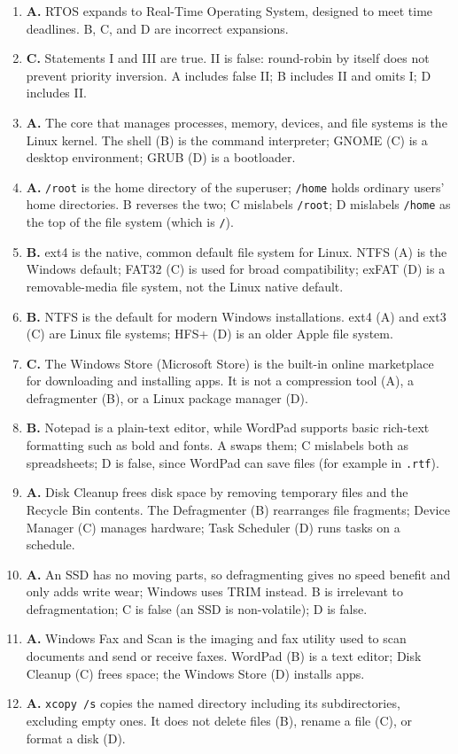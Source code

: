 \documentclass[11pt]{article}
\begin{document}
\begin{enumerate}[label=\textbf{Q\arabic*.}, leftmargin=*]
  process as soon as a higher-priority process becomes ready. A and C describe
  non-preemptive behaviour; D is not a preemption trigger.
\item \textbf{A.} RTOS expands to Real-Time Operating System, designed to meet
  time deadlines. B, C, and D are incorrect expansions.
\item \textbf{C.} Statements I and III are true. II is false: round-robin by
  itself does not prevent priority inversion. A includes false II; B includes
  II and omits I; D includes II.
\item \textbf{A.} The core that manages processes, memory, devices, and file
  systems is the Linux kernel. The shell (B) is the command interpreter; GNOME
  (C) is a desktop environment; GRUB (D) is a bootloader.
\item \textbf{A.} \texttt{/root} is the home directory of the superuser;
  \texttt{/home} holds ordinary users' home directories. B reverses the two;
  C mislabels \texttt{/root}; D mislabels \texttt{/home} as the top of the
  file system (which is \texttt{/}).
\item \textbf{B.} ext4 is the native, common default file system for Linux.
  NTFS (A) is the Windows default; FAT32 (C) is used for broad compatibility;
  exFAT (D) is a removable-media file system, not the Linux native default.
\item \textbf{B.} NTFS is the default for modern Windows installations. ext4
  (A) and ext3 (C) are Linux file systems; HFS+ (D) is an older Apple file
  system.
\item \textbf{C.} The Windows Store (Microsoft Store) is the built-in online
  marketplace for downloading and installing apps. It is not a compression
  tool (A), a defragmenter (B), or a Linux package manager (D).
\item \textbf{B.} Notepad is a plain-text editor, while WordPad supports basic
  rich-text formatting such as bold and fonts. A swaps them; C mislabels both
  as spreadsheets; D is false, since WordPad can save files (for example in
  \texttt{.rtf}).
\item \textbf{A.} Disk Cleanup frees disk space by removing temporary files
  and the Recycle Bin contents. The Defragmenter (B) rearranges file
  fragments; Device Manager (C) manages hardware; Task Scheduler (D) runs
  tasks on a schedule.
\item \textbf{A.} An SSD has no moving parts, so defragmenting gives no speed
  benefit and only adds write wear; Windows uses TRIM instead. B is
  irrelevant to defragmentation; C is false (an SSD is non-volatile); D is
  false.
\item \textbf{A.} Windows Fax and Scan is the imaging and fax utility used to
  scan documents and send or receive faxes. WordPad (B) is a text editor;
  Disk Cleanup (C) frees space; the Windows Store (D) installs apps.
\item \textbf{A.} \texttt{xcopy /s} copies the named directory including its
  subdirectories, excluding empty ones. It does not delete files (B), rename a
  file (C), or format a disk (D).


\end{enumerate}
\end{document}
